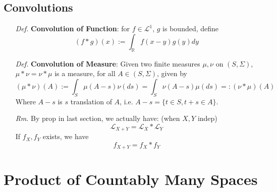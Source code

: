 \documentclass[a4paper,12pt,twoside]{book}
\begin{document}
\subsection{Convolutions}
\begin{itemize}
	\item[\textit{Def.}] \textbf{Convolution of Function}: for $f\in \mathcal{L}^1$, $g$ is bounded, define
	$$(f*g)(x):=\int_{\mathbb{R}}f(x-y)g(y)dy$$

	\item[\textit{Def.}] \textbf{Convolution of Measure}: Given two finite measures $\mu,\nu$ on $(S, \Sigma)$, $\mu * \nu = \nu * \mu$ is a measure, for all $A\in (S, \Sigma)$, given by
	$$(\mu*\nu)(A):=\int_S \mu(A-s)\nu(ds)=\int_S \nu(A-s)\mu(ds)=:(\nu*\mu)(A)$$
	Where $A-s$ is $s$ translation of $A$, i.e. $A-s=\{t\in S, t+s \in A\}$.

	\item[\textit{Rm.}] By prop in last section, we actually have: (when $X,Y$ indep)
	$$\mathcal{L}_{X+Y}=\mathcal{L}_X * \mathcal{L}_Y$$
	If $f_X, f_Y$ exists, we have
	$$f_{X+Y}=f_X * f_Y$$
\end{itemize}

\section{Product of Countably Many Spaces}

\end{document}
